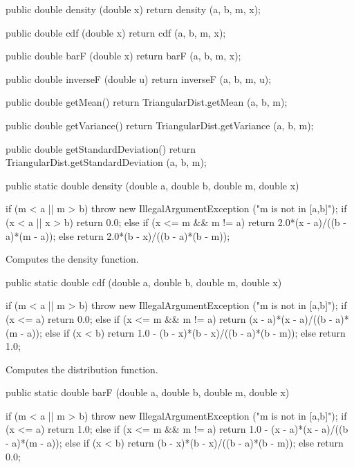 \begin{code}\begin{hide}

   public double density (double x) {
      return density (a, b, m, x);
   }
       
   public double cdf (double x) {
      return cdf (a, b, m, x);
   }

   public double barF (double x) {
      return barF (a, b, m, x);
   }
     
   public double inverseF (double u){
      return inverseF (a, b, m, u);
   }

   public double getMean() {
      return TriangularDist.getMean (a, b, m);
   }

   public double getVariance() {
      return TriangularDist.getVariance (a, b, m);
   }

   public double getStandardDeviation() {
      return TriangularDist.getStandardDeviation (a, b, m);
   }\end{hide}

   public static double density (double a, double b, double m, double x)\begin{hide} {
      if (m < a || m > b)
         throw new IllegalArgumentException ("m is not in [a,b]");
      if (x < a || x > b)
         return 0.0;
      else if (x <= m && m != a)
         return 2.0*(x - a)/((b - a)*(m - a));
      else
         return 2.0*(b - x)/((b - a)*(b - m));
   }\end{hide}
\end{code}
\begin{tabb} Computes the density function.
\end{tabb}
\begin{code}      

   public static double cdf (double a, double b, double m, double x)\begin{hide} {
      if (m < a || m > b)
         throw new IllegalArgumentException ("m is not in [a,b]");
      if (x <= a)
         return 0.0;
      else if (x <= m && m != a)
         return (x - a)*(x - a)/((b - a)*(m - a));
      else if (x < b)
         return 1.0 - (b - x)*(b - x)/((b - a)*(b - m));
      else
         return 1.0;
   }\end{hide}
\end{code}
 \begin{tabb}
  Computes the  distribution function.
 \end{tabb}
\begin{code}

   public static double barF (double a, double b, double m, double x)\begin{hide} {
      if (m < a || m > b)
         throw new IllegalArgumentException ("m is not in [a,b]");
      if (x <= a)
         return 1.0;
      else if (x <= m && m != a)
         return 1.0 - (x - a)*(x - a)/((b - a)*(m - a));
      else if (x < b)
         return (b - x)*(b - x)/((b - a)*(b - m));
      else
         return 0.0;
   }\end{hide}
\end{code}
